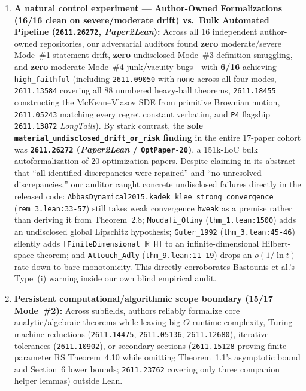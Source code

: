 \documentclass[11pt,letterpaper]{article}
\begin{document}
\begin{enumerate}
  \item \textbf{A natural control experiment --- Author-Owned Formalizations (16/16 clean on severe/moderate drift) vs.\ Bulk Automated Pipeline (\texttt{2611.26272}, \emph{Paper2Lean}):} Across all 16 independent author-owned repositories, our adversarial auditors found \textbf{zero} moderate/severe Mode~\#1 statement drift, \textbf{zero} undisclosed Mode~\#3 definition smuggling, and \textbf{zero} moderate Mode~\#4 junk/vacuity bugs---with \textbf{6/16} achieving \texttt{high\_faithful} (including \texttt{2611.09050} with \texttt{none} across all four modes, \texttt{2611.13584} covering all 88 numbered heavy-ball theorems, \texttt{2611.18455} constructing the McKean--Vlasov SDE from primitive Brownian motion, \texttt{2611.05243} matching every regret constant verbatim, and \texttt{P4} flagship \texttt{2611.13872} \emph{LongTails}). By stark contrast, the \textbf{sole \texttt{material\_undisclosed\_drift\_or\_risk} finding} in the entire 17-paper cohort was \textbf{\texttt{2611.26272} (\emph{Paper2Lean} / \texttt{OptPaper-20})}, a 151k-LoC bulk autoformalization of 20 optimization papers. Despite claiming in its abstract that ``all identified discrepancies were repaired'' and ``no unresolved discrepancies,'' our auditor caught concrete undisclosed failures directly in the released code: \texttt{AbbasDynamical2015.kadek\_klee\_strong\_convergence} (\texttt{rem\_3.lean:33-57}) still takes weak convergence \texttt{hweak} as a premise rather than deriving it from Theorem~2.8; \texttt{Moudafi\_Oliny} (\texttt{thm\_1.lean:1500}) adds an undisclosed global Lipschitz hypothesis; \texttt{Guler\_1992} (\texttt{thm\_3.lean:45-46}) silently adds \texttt{[FiniteDimensional $\mathbb{R}$ H]} to an infinite-dimensional Hilbert-space theorem; and \texttt{Attouch\_Adly} (\texttt{thm\_9.lean:11-19}) drops an $o(1/\ln t)$ rate down to bare monotonicity. This directly corroborates Bastounis et al.'s Type~(i) warning inside our own blind empirical audit.
  \item \textbf{Persistent computational/algorithmic scope boundary (15/17 Mode~\#2):} Across subfields, authors reliably formalize core analytic/algebraic theorems while leaving big-$O$ runtime complexity, Turing-machine reductions (\texttt{2611.14475}, \texttt{2611.05136}, \texttt{2611.12680}), iterative tolerances (\texttt{2611.10902}), or secondary sections (\texttt{2611.15128} proving finite-parameter RS Theorem~4.10 while omitting Theorem~1.1's asymptotic bound and Section~6 lower bounds; \texttt{2611.23762} covering only three companion helper lemmas) outside Lean.

\end{enumerate}
\end{document}
